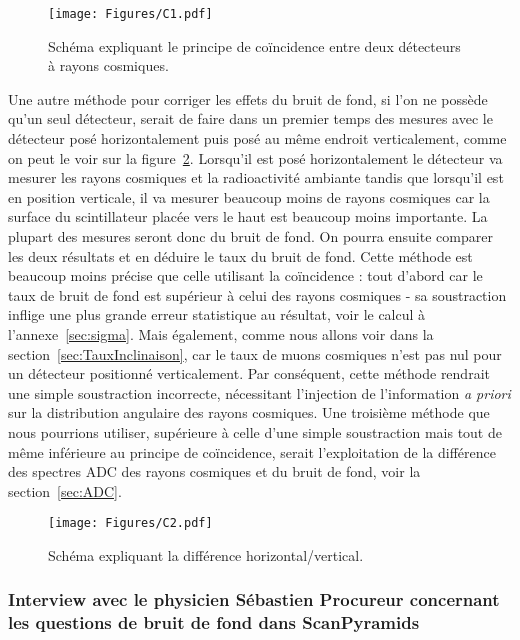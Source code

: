 \documentclass[a4paper, 12pt]{article}
\begin{document}
\begin{spacing}{1.5}
\begin{figure}[t]
\begin{center}
\texttt{[image: Figures/C1.pdf]}
\caption{\label{fig:coincidence} Schéma expliquant le principe de coïncidence entre deux détecteurs à rayons cosmiques.}
\end{center}
\end{figure}

Une autre méthode pour corriger les effets du bruit de fond, si l'on ne possède qu’un seul détecteur, serait de faire dans un premier temps des mesures avec le détecteur posé horizontalement puis posé au même endroit verticalement, comme on peut le voir sur la figure~\ref{fig:hor.ver}. Lorsqu'il est posé horizontalement le détecteur va mesurer les rayons cosmiques et la radioactivité ambiante tandis que lorsqu'il est en position verticale, il va mesurer beaucoup moins de rayons cosmiques car la surface du scintillateur placée vers le haut est beaucoup moins importante. La plupart des mesures seront donc du bruit de fond. On pourra ensuite comparer les deux résultats et en déduire le taux du bruit de fond. Cette méthode est beaucoup moins précise que celle utilisant la coïncidence : tout d'abord car le taux de bruit de fond est supérieur à celui des rayons cosmiques - sa soustraction inflige une plus grande erreur statistique au résultat, voir le calcul à l'annexe~\ref{sec:sigma}. Mais également, comme nous allons voir dans la section~\ref{sec:TauxInclinaison}, car le taux de muons cosmiques n'est pas nul pour un détecteur positionné verticalement. Par conséquent, cette méthode rendrait une simple soustraction incorrecte, nécessitant l'injection de l'information \emph{a priori} sur la distribution angulaire des rayons cosmiques. Une troisième méthode que nous pourrions utiliser, supérieure à celle d'une simple soustraction mais tout de même inférieure au principe de coïncidence, serait l'exploitation de la différence des spectres ADC des rayons cosmiques et du bruit de fond, voir la section~\ref{sec:ADC}.

\begin{figure}[t]
\begin{center}
\texttt{[image: Figures/C2.pdf]}
\caption{\label{fig:hor.ver} Schéma expliquant la différence horizontal/vertical.}
\end{center}
\end{figure}

\subsubsection{Interview avec le physicien Sébastien Procureur concernant les questions de bruit de fond dans ScanPyramids}


\end{spacing}
\end{document}

